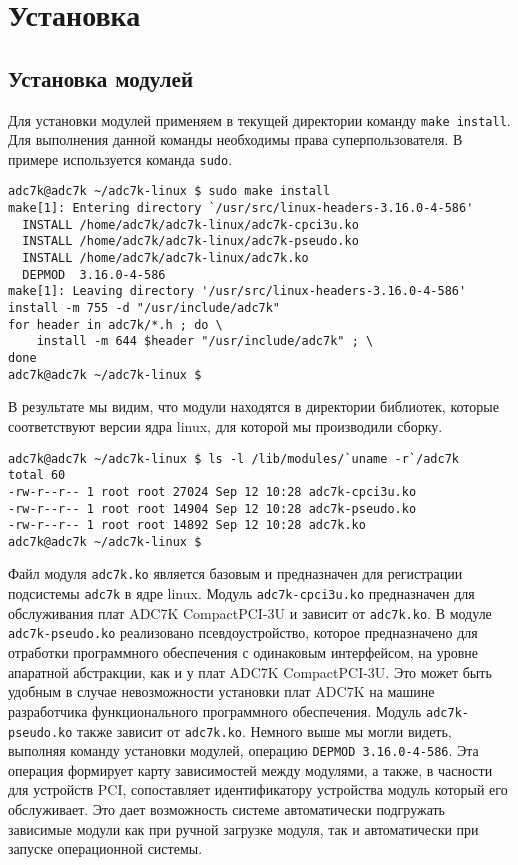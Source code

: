 \documentclass[a4paper]{article}
\begin{document}
\section{Установка}
\subsection{Установка модулей}

Для установки модулей применяем в текущей директории команду
\mbox{\texttt{make install}}. Для выполнения данной команды необходимы права
суперпользователя. В примере используется команда \texttt{sudo}.
\begin{small}\begin{verbatim}
adc7k@adc7k ~/adc7k-linux $ sudo make install
make[1]: Entering directory `/usr/src/linux-headers-3.16.0-4-586'
  INSTALL /home/adc7k/adc7k-linux/adc7k-cpci3u.ko
  INSTALL /home/adc7k/adc7k-linux/adc7k-pseudo.ko
  INSTALL /home/adc7k/adc7k-linux/adc7k.ko
  DEPMOD  3.16.0-4-586
make[1]: Leaving directory '/usr/src/linux-headers-3.16.0-4-586'
install -m 755 -d "/usr/include/adc7k"
for header in adc7k/*.h ; do \
	install -m 644 $header "/usr/include/adc7k" ; \
done
adc7k@adc7k ~/adc7k-linux $
\end{verbatim}\end{small}

В результате мы видим, что модули находятся в директории библиотек, которые
соответствуют версии ядра linux, для которой мы производили сборку.
\begin{small}\begin{verbatim}
adc7k@adc7k ~/adc7k-linux $ ls -l /lib/modules/`uname -r`/adc7k
total 60
-rw-r--r-- 1 root root 27024 Sep 12 10:28 adc7k-cpci3u.ko
-rw-r--r-- 1 root root 14904 Sep 12 10:28 adc7k-pseudo.ko
-rw-r--r-- 1 root root 14892 Sep 12 10:28 adc7k.ko
adc7k@adc7k ~/adc7k-linux $
\end{verbatim}\end{small}

Файл модуля \mbox{\texttt{adc7k.ko}} является базовым и предназначен для
регистрации подсистемы \texttt{adc7k} в ядре linux. Модуль \mbox{\texttt{adc7k-cpci3u.ko}}
предназначен для обслуживания плат ADC7K \mbox{CompactPCI-3U} и зависит от \mbox{\texttt{adc7k.ko}}.
В модуле \mbox{\texttt{adc7k-pseudo.ko}} реализовано псевдоустройство, которое
предназначено для отработки программного обеспечения с одинаковым интерфейсом, на
уровне апаратной абстракции, как и у плат ADC7K \mbox{CompactPCI-3U}. Это может быть удобным в случае
невозможности установки плат ADC7K на машине разработчика функционального программного обеспечения.
Модуль \mbox{\texttt{adc7k-pseudo.ko}} также зависит от \mbox{\texttt{adc7k.ko}}.
Немного выше мы могли видеть, выполняя команду установки модулей, операцию
\mbox{\texttt{DEPMOD  3.16.0-4-586}}. Эта операция формирует карту зависимостей между
модулями, а также, в часности для устройств PCI, сопоставляет идентификатору устройства модуль
который его обслуживает. Это дает возможность системе автоматически подгружать зависимые модули как при
ручной загрузке модуля, так и автоматически при запуске операционной системы.
\end{document}
